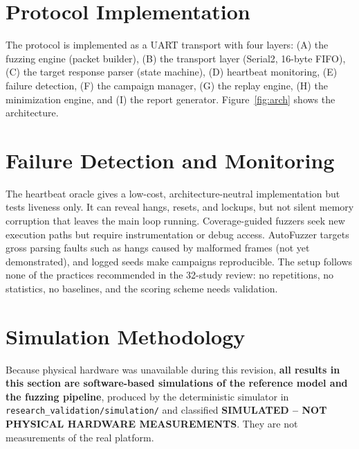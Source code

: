 \documentclass[10pt,letterpaper]{article}
\begin{document}
\section{Protocol Implementation}
The protocol is implemented as a UART transport with four layers: (A) the fuzzing engine (packet builder), (B) the transport layer (Serial2, 16-byte FIFO), (C) the target response parser (state machine), (D) heartbeat monitoring, (E) failure detection, (F) the campaign manager, (G) the replay engine, (H) the minimization engine, and (I) the report generator. Figure~\ref{fig:arch} shows the architecture.

\section{Failure Detection and Monitoring}
The heartbeat oracle gives a low-cost, architecture-neutral implementation but tests liveness only. It can reveal hangs, resets, and lockups, but not silent memory corruption that leaves the main loop running. Coverage-guided fuzzers seek new execution paths but require instrumentation or debug access. AutoFuzzer targets gross parsing faults such as hangs caused by malformed frames (not yet demonstrated), and logged seeds make campaigns reproducible. The setup follows none of the practices recommended in the 32-study review: no repetitions, no statistics, no baselines, and the scoring scheme needs validation.

\section{Simulation Methodology}
Because physical hardware was unavailable during this revision, \textbf{all results in this section are software-based simulations of the reference model and the fuzzing pipeline}, produced by the deterministic simulator in \verb|research_validation/simulation/| and classified \textbf{SIMULATED -- NOT PHYSICAL HARDWARE MEASUREMENTS}. They are not measurements of the real platform.
\end{document}

